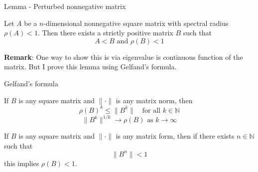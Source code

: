 \documentclass[aspectratio=169]{beamer} %
\begin{document}
\begin{frame}{Lemma - Perturbed nonnegative matrix}
\begin{lemma}\label{lm: perturbed}
Let $A$ be a $n$-dimensional nonnegative square matrix with spectral radius $\rho(A)<1$. Then there exists a strictly positive matrix $B$ such that 
$$
A< B\text{ and $\rho(B)<1$}
$$
\end{lemma}
\textbf{Remark}: One way to show this is via eigenvalue is continuous function of the matrix. But I prove this lemma using Gelfand's formula.
    
\end{frame}
\begin{frame}{Gelfand's formula}
\begin{lemma}\label{lm:gelfand}
    If $B$ is any square matrix and $\|\cdot\|$ is any matrix norm, then
    $$
    \rho(B)^k\le \|B^k\|\quad \text{for all $k\in\mathbb{N}$}
    $$
    $$
    \|B^k\|^{1/k}\to \rho(B)\text{ as $k\to\infty$}
    $$
\end{lemma}
\begin{corollary}\label{col:gelfand col}
    If $B$ is any square matrix and $\|\cdot\|$ is any matrix form, then if there exists $n\in\mathbb{N}$ such that 
    $$
    \|B^n\|<1
    $$
    this implies $\rho(B)<1$.
\end{corollary}
    
\end{frame}
\end{document}
